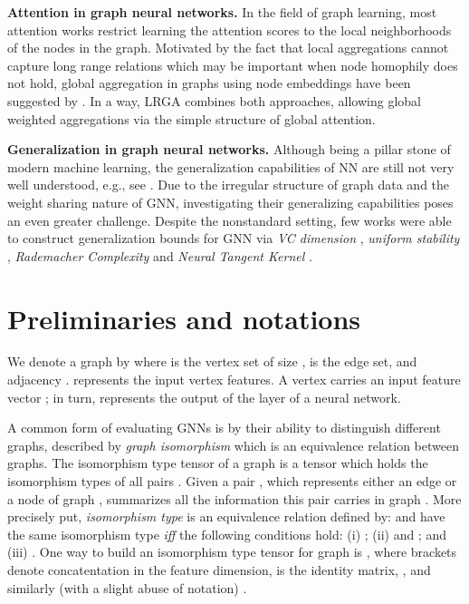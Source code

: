 \documentclass{article} \usepackage{iclr2021_conference,times}
\newcommand{\eg}{{e.g.}}
\begin{document}
\textbf{Attention in graph neural networks. } In the field of graph learning, most attention works \citep{Li2015,Velickovic2018,Abu-El-Haija2018,Bresson2017Gated, Lee2018} restrict learning the attention scores to the local neighborhoods of the nodes in the graph. Motivated by the fact that local aggregations cannot capture long range relations which may be important when node homophily does not hold, global aggregation in graphs using node embeddings have been suggested by \citep{You2019position,Pei2020}. In a way, LRGA combines both approaches, allowing global weighted aggregations via the simple structure of global attention.



\textbf{Generalization in graph neural networks.}
Although being a pillar stone of modern machine learning, the generalization capabilities of NN are still not very well understood, \eg, see \citep{bartlett2017spectrallynormalized,golowich2019sizeindependent}. Due to the irregular structure of graph data and the weight sharing nature of GNN, investigating their generalizing capabilities poses an even greater challenge. Despite the nonstandard setting, few works were able to construct generalization bounds for GNN via \emph{VC dimension} \citep{article}, \emph{uniform stability} \citep{verma2019stability}, \emph{Rademacher Complexity} \citep{garg2020generalization} and \emph{Neural Tangent Kernel} \citep{du2019graph}.








\section{Preliminaries and notations} \label{sec:prelim}
 We denote a graph by  where  is the vertex set of size ,  is the edge set, and adjacency .  represents the input vertex features.  A vertex  carries an input feature vector ; in turn,  represents the output of the  layer of a neural network. 
 
 A common form of evaluating GNNs is by their ability to distinguish different graphs, described by \emph{graph isomorphism} which is an equivalence relation between graphs. The isomorphism type tensor of a graph  is a tensor  which holds the isomorphism types of all pairs . Given a pair , which represents either an edge or a node of graph ,  summarizes all the information this pair carries in graph . More precisely put, \emph{isomorphism type} is an equivalence relation defined by:  and  have the same isomorphism type \emph{iff} the following conditions hold: (i)   ; (ii)  and ; and (iii)   . One way to build an isomorphism type tensor for graph  is 
, where brackets denote concatentation in the feature dimension,  is the identity matrix, , and similarly (with a slight abuse of notation) . 
\end{document}
